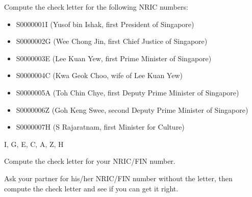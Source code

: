 \documentclass[a4paper,12pt]{article}
\begin{document}
\begin{question}[skip-below=0\baselineskip]
Compute the check letter for the following NRIC numbers:
\begin{itemize}
    \item S0000001I (Yusof bin Ishak, first President of Singapore)
    \item S0000002G (Wee Chong Jin, first Chief Justice of Singapore)
    \item S0000003E (Lee Kuan Yew, first Prime Minister of Singapore)
    \item S0000004C (Kwa Geok Choo, wife of Lee Kuan Yew)
    \item S0000005A (Toh Chin Chye, first Deputy Prime Minister of Singapore)
    \item S0000006Z (Goh Keng Swee, second Deputy Prime Minister of Singapore)
    \item S0000007H (S Rajaratnam, first Minister for Culture)
\end{itemize}
\end{question}
\begin{solution}
I, G, E, C, A, Z, H
\end{solution}

\begin{question}[skip-below=3\baselineskip]
Compute the check letter for your NRIC/FIN number.
\end{question}

\begin{question}[skip-below=3\baselineskip]
Ask your partner for his/her NRIC/FIN number without the letter, then compute
the check letter and see if you can get it right.
\end{question}
\end{document}
